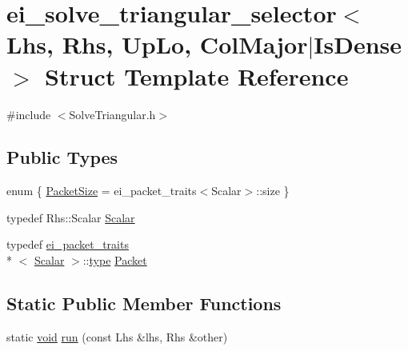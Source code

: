 \hypertarget{structei__solve__triangular__selector_3_01_lhs_00_01_rhs_00_01_up_lo_00_01_col_major_7_is_dense_01_4}{\section{ei\-\_\-solve\-\_\-triangular\-\_\-selector$<$ Lhs, Rhs, Up\-Lo, Col\-Major$|$\-Is\-Dense $>$ Struct Template Reference}
\label{structei__solve__triangular__selector_3_01_lhs_00_01_rhs_00_01_up_lo_00_01_col_major_7_is_dense_01_4}
}


{\ttfamily \#include $<$Solve\-Triangular.\-h$>$}

\subsection*{Public Types}
\begin{DoxyCompactItemize}
\item 
enum \{ \hyperlink{structei__solve__triangular__selector_3_01_lhs_00_01_rhs_00_01_up_lo_00_01_col_major_7_is_dense_01_4_ac265f77541aaee8c94025a5eb2046168a5b0a228d64da0d85bb86f3628378e35b}{Packet\-Size} = ei\-\_\-packet\-\_\-traits$<$Scalar$>$\-:\-:size
 \}
\item 
typedef Rhs\-::\-Scalar \hyperlink{structei__solve__triangular__selector_3_01_lhs_00_01_rhs_00_01_up_lo_00_01_col_major_7_is_dense_01_4_a5e3666a72ce9816a2c355ab60e19cf89}{Scalar}
\item 
typedef \hyperlink{structei__packet__traits}{ei\-\_\-packet\-\_\-traits}\\*
$<$ \hyperlink{structei__solve__triangular__selector_3_01_lhs_00_01_rhs_00_01_up_lo_00_01_col_major_7_is_dense_01_4_a5e3666a72ce9816a2c355ab60e19cf89}{Scalar} $>$\-::\hyperlink{glext_8h_a7d05960f4f1c1b11f3177dc963a45d86}{type} \hyperlink{structei__solve__triangular__selector_3_01_lhs_00_01_rhs_00_01_up_lo_00_01_col_major_7_is_dense_01_4_a2b9d94b8bdf9a73359a63a2950ad475a}{Packet}
\end{DoxyCompactItemize}
\subsection*{Static Public Member Functions}
\begin{DoxyCompactItemize}
\item 
static \hyperlink{group___u_a_v_objects_plugin_ga444cf2ff3f0ecbe028adce838d373f5c}{void} \hyperlink{structei__solve__triangular__selector_3_01_lhs_00_01_rhs_00_01_up_lo_00_01_col_major_7_is_dense_01_4_af3678f4607376de955017046479026fa}{run} (const Lhs \&lhs, Rhs \&other)
\end{DoxyCompactItemize}



